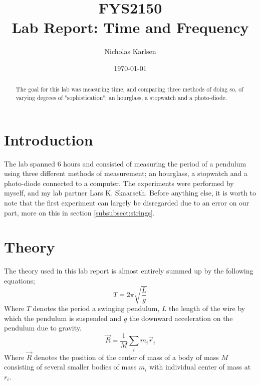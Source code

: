 \documentclass[%
 reprint,
 amsmath,amssymb,
 aps,
]{revtex4-1}
\begin{document}

\title{FYS2150 \\
Lab Report: Time and Frequency}%

\author{Nicholas Karlsen}

\date{\today}%

\begin{abstract}
The goal for this lab was measuring time, and comparing three methods of doing so, of varying degrees of "sophistication"; an hourglass, a stopwatch and a photo-diode.
\end{abstract}

\maketitle


\section{\label{sec:intro}Introduction}
	The lab spanned 6 hours and consisted of measuring the period of a pendulum using three different methods of measurement; an hourglass, a stopwatch and a photo-diode connected to a computer. The experiments were performed by myself, and my lab partner Lars K. Skaarseth.
	Before anything else, it is worth to note that the first experiment can largely be disregarded due to an error on our part, more on this in section \ref{subsubsect:strings}.

\section{Theory}
	The theory used in this lab report is almost entirely summed up by the following equations;
	\begin{equation}
        \label{eqn:period}
		T = 2\pi \sqrt{\frac{L}{g}}
	\end{equation}
	Where $T$ denotes the period a swinging pendulum, $L$ the length of the wire by which the pendulum is suspended and $g$ the downward acceleration on the pendulum due to gravity.
	\begin{equation}
		\vec R = \frac{1}{M} \sum_i m_i \vec r_i
	\end{equation}
	Where $\vec R$ denotes the position of the center of mass of a body of mass $M$ consisting of several smaller bodies of mass $m_i$ with individual center of mass at $r_i$.
\end{document}
